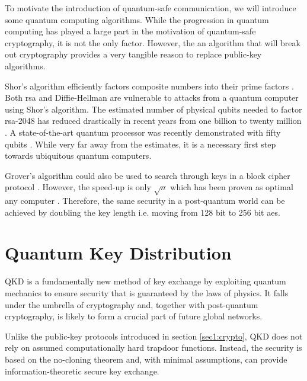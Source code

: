 To motivate the introduction of quantum-safe communication, we will introduce some quantum computing algorithms. While the progression in quantum computing has played a large part in the motivation of quantum-safe cryptography, it is not the only factor. However, the an algorithm that will break out cryptography provides a very tangible reason to replace public-key algorithms.


Shor's algorithm efficiently factors composite numbers into their prime factors \cite{shor1994}. Both \ac{rsa} and Diffie-Hellman are vulnerable to attacks from a quantum computer using Shor's algorithm. The estimated number of physical qubits needed to factor \ac{rsa}-2048 has reduced drastically in recent years from one billion \cite{mosca2018, fowler2012} to twenty million \cite{gidney2019}. A state-of-the-art quantum processor was recently demonstrated with fifty qubits \cite{arute2019quantum}. While very far away from the estimates, it is a necessary first step towards ubiquitous quantum computers.

Grover's algorithm could also be used to search through keys in a block cipher protocol \cite{grover1996fast}. However, the speed-up is only $\sqrt{n}$ which has been proven as optimal any computer \cite{Bennent1997}. Therefore, the same security in a post-quantum world can be achieved by doubling the key length i.e. moving from 128 bit to 256 bit \ac{aes}.

\section{Quantum Key Distribution}

\Acf{QKD} is a fundamentally new method of key exchange by exploiting quantum mechanics to ensure security that is guaranteed by the laws of physics. It falls under the umbrella of  cryptography and, together with post-quantum cryptography, is likely to form a crucial part of future global networks.

Unlike the public-key protocols introduced in section \ref{sec1:crypto}, \ac{QKD} does not rely on assumed computationally hard trapdoor functions. Instead, the security is based on the no-cloning theorem and, with minimal assumptions, can provide information-theoretic secure key exchange.

